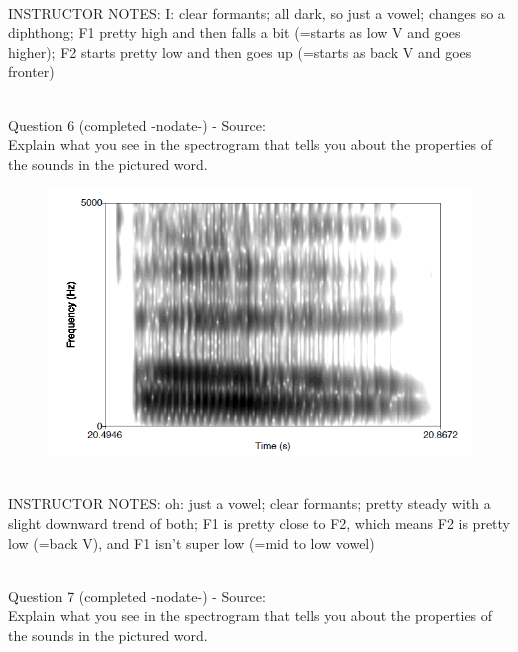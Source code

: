 \documentclass[12pt]{article}
\begin{document}
~\\
INSTRUCTOR NOTES: I: clear formants; all dark, so just a vowel; changes so a diphthong; F1 pretty high and then falls a bit (=starts as low V and goes higher); F2 starts pretty low and then goes up (=starts as back V and goes fronter)


~\\

{\large Question 6} (completed -nodate-) - Source: \\

Explain what you see in the spectrogram that tells you about the properties of the sounds in the pictured word.\\

\begin{figure}[H]
\includegraphics{../images/spectrogram_oh.png}
\end{figure}

~\\
INSTRUCTOR NOTES: oh: just a vowel; clear formants; pretty steady with a slight downward trend of both; F1 is pretty close to F2, which means F2 is pretty low (=back V), and F1 isn't super low (=mid to low vowel)


~\\

{\large Question 7} (completed -nodate-) - Source: \\

Explain what you see in the spectrogram that tells you about the properties of the sounds in the pictured word.\\
\end{document}
